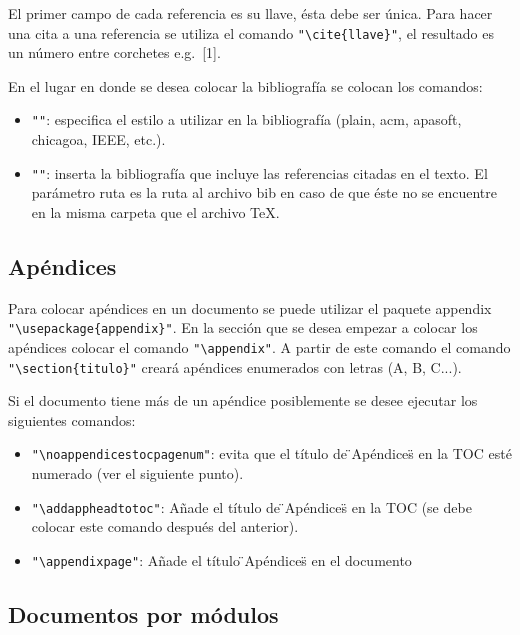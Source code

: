 \documentclass[12pt, a4paper,twoside]{article} %
\begin{document}
El primer campo de cada referencia es su llave, ésta debe ser única. Para hacer una cita a una referencia se utiliza el comando \lstinline$"\cite{llave}"$, el resultado es un número entre corchetes e.g.~[1].

En el lugar en donde se desea colocar la bibliografía se colocan los comandos:

\begin{itemize}
\item\lstinline$""$: especifica el estilo a utilizar en la bibliografía (plain, acm, apasoft, chicagoa, IEEE, etc.). 
\item\lstinline$""$: inserta la bibliografía que incluye las referencias citadas en el texto. El parámetro ruta es la ruta al archivo bib en caso de que éste no se encuentre en la misma carpeta que el archivo TeX.
\end{itemize}

\subsection{Apéndices}

Para colocar apéndices en un documento se puede utilizar el paquete appendix \lstinline$"\usepackage{appendix}"$. En la sección que se desea empezar a colocar los apéndices colocar el comando \lstinline$"\appendix"$. A partir de este comando el comando \lstinline$"\section{titulo}"$ creará apéndices enumerados con letras (A, B, C...).

Si el documento tiene más de un apéndice posiblemente se desee ejecutar los siguientes comandos:


\begin{itemize}
\item\lstinline$"\noappendicestocpagenum"$: evita que el título de \"{}Apéndices\"{} en la TOC esté numerado (ver el siguiente punto).
\item\lstinline$"\addappheadtotoc"$: Añade el título de \"{}Apéndices\"{} en la TOC (se debe colocar este comando después del anterior).
\item\lstinline$"\appendixpage"$: Añade el título \"{}Apéndices\"{} en el documento
\end{itemize}

\subsection{Documentos por módulos}
\end{document}
